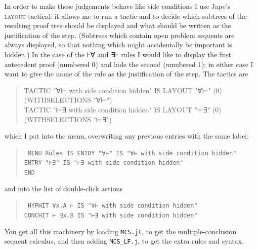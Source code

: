 In order to make these judgements behave like side conditions I use Jape's \textsc{layout} tactical: it allows me to run a tactic and to decide which subtrees of the resulting proof tree should be displayed and what should be written as the justification of the step. (Subtrees which contain open problem sequents are always displayed, so that nothing which might accidentally be important is hidden.) In the case of the ⊦∀ and ∃⊦ rules I would like to display the first antecedent proof (numbered 0) and hide the second (numbered 1); in either case I want to give the name of the rule as the justification of the step. The tactics are
\begin{quote}\tt\small

TACTIC "∀⊢ with side condition hidden" IS LAYOUT "∀⊢" (0) (WITHSELECTIONS "∀⊢")\\
TACTIC "⊢∃ with side condition hidden" IS LAYOUT "⊢∃" (0) (WITHSELECTIONS "⊢∃")
\end{quote}
which I put into the menu, overwriting any previous entries with the same label:
\begin{quote}\tt\small
MENU Rules IS
\tab ENTRY "∀⊢" IS "∀⊢ with side condition hidden"\\
\tab ENTRY "⊢∃" IS "⊢∃ with side condition hidden"\\
END
\end{quote}
and into the list of double-click actions
\begin{quote}\tt\small
HYPHIT  ∀x.A ⊢  IS "∀⊢ with side condition hidden"\\
CONCHIT ⊢ ∃x.B  IS "⊢∃ with side condition hidden"
\end{quote}
You get all this machinery by loading \texttt{MCS.jt}, to get the multiple-conclusion sequent calculus, and then adding \texttt{MCS\_LF.j}, to get the extra rules and syntax.

